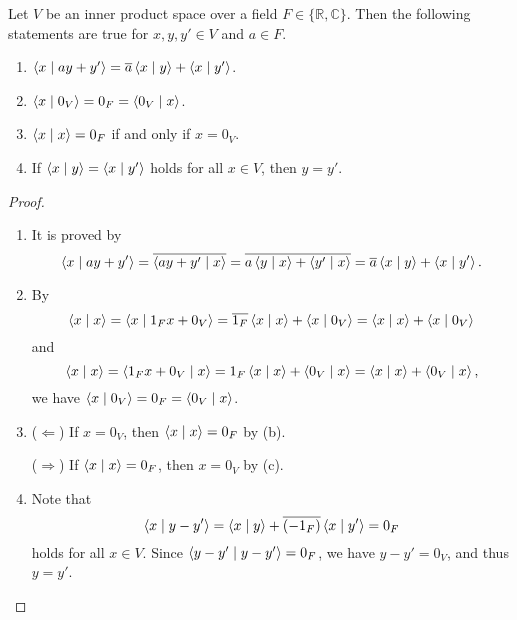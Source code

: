 \begin{proposition}
  \label{thm:inner-product-basic}
  Let $V$ be an inner product space over a field
  $F \in \{\mathbb{R}, \mathbb{C}\}$.
  Then the following statements are true for $x, y, y' \in V$ and $a \in F$.
  \begin{enumerate}
    \item $\inner{x}{ay + y'} = \overline{a}\inner{x}{y} + \inner{x}{y'}$.
    \item $\inner{x}{0_V} = 0_F = \inner{0_V}{x}$.
    \item $\inner{x}{x} = 0_F$ if and only if $x = 0_V$.
    \item If $\inner{x}{y} = \inner{x}{y'}$ holds for all $x \in V$, then
    $y = y'$.
  \end{enumerate}
\end{proposition}
\begin{proof}
  \leavevmode
  \begin{enumerate}
    \item It is proved by
    \begin{equation*}
      \inner{x}{ay + y'}
      = \overline{\inner{ay + y'}{x}}
      = \overline{a\inner{y}{x} + \inner{y'}{x}}
      = \overline{a}\inner{x}{y} + \inner{x}{y'}.
    \end{equation*}

    \item By
    \begin{equation*}
      \inner{x}{x}
      = \inner{x}{1_Fx + 0_V}
      = \overline{1_F}\inner{x}{x} + \inner{x}{0_V}
      = \inner{x}{x} + \inner{x}{0_V}
    \end{equation*}
    and
    \begin{equation*}
      \inner{x}{x}
      = \inner{1_Fx + 0_V}{x}
      = 1_F\inner{x}{x} + \inner{0_V}{x}
      = \inner{x}{x} + \inner{0_V}{x},
    \end{equation*}
    we have $\inner{x}{0_V} = 0_F = \inner{0_V}{x}$.

    \item ($\Leftarrow$) If $x = 0_V$, then $\inner{x}{x} = 0_F$ by (b).

    ($\Rightarrow$) If $\inner{x}{x} = 0_F$, then $x = 0_V$ by
     (c).

    \item Note that
    \begin{equation*}
      \inner{x}{y - y'} = \inner{x}{y} + \overline{(-1_F)}\inner{x}{y'} = 0_F
    \end{equation*}
    holds for all $x \in V$.
    Since $\inner{y - y'}{y - y'} = 0_F$, we have $y - y' = 0_V$,
    and thus $y = y'$.
    \qedhere
  \end{enumerate}
\end{proof}

